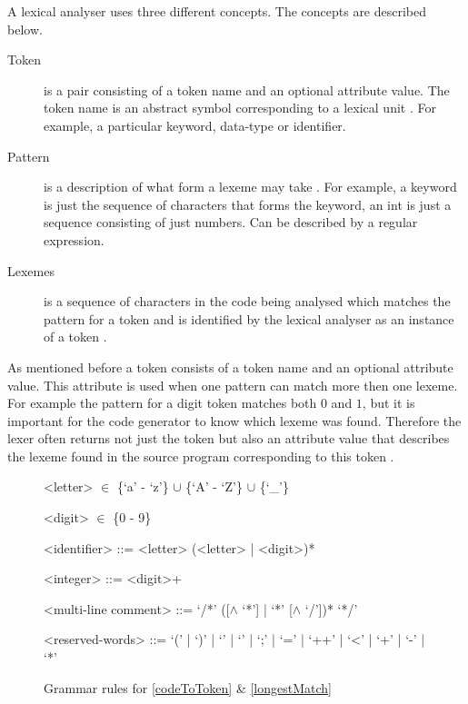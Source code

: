 A lexical analyser uses three different concepts. The concepts are described 
below. 
\begin{description}
  \item[Token]
    is a pair consisting of a token name and an optional attribute value. The 
token name is an abstract symbol corresponding to a lexical unit \cite{Aho2006}. 
For example, a particular keyword, data-type or identifier.
  \item[Pattern]
    is a description of what form a lexeme may take \cite{Aho2006}. 
For example, a keyword is just the sequence of characters that forms the 
keyword, an int is just a sequence consisting of just numbers. Can be described 
by a regular expression.
  \item[Lexemes]
    is a sequence of characters in the code being analysed which 
matches the pattern for a token and is identified by the lexical analyser as an 
instance of a token \cite{Aho2006}.
\end{description}
As mentioned before a token consists of a token name and an optional attribute value. 
This attribute is used when one pattern can match more then one lexeme.
For example the pattern for a digit token matches both $0$ and $1$, 
but it is important for the code generator to know which lexeme was found. 
Therefore the lexer often returns not just the token but also an attribute value 
that describes the lexeme found in the source program corresponding to this 
token \cite{Aho2006}.

\begin{figure}[h!]
\begin{center}
\begin{grammar}

<letter>  $\in$ \{`a' - `z'\} $\cup$ \{`A' - `Z'\} $\cup$ \{`_'\}

<digit>  $\in$ \{0 - 9\}

<identifier> ::= <letter> (<letter> | <digit>)* 

<integer> ::= <digit>+

<multi-line comment> ::= `/*' ([$\wedge$ `*'] | `*' [$\wedge$ `/'])* `*/'

<reserved-words> ::= `(' | `)' | `{' | `}' | `;' | `=' | `++' | `<' | `+' | `-' | `*'

\end{grammar}
\caption{Grammar rules for \cref{codeToToken} \& \cref{longestMatch}\label{fig:grammar}}
\end{center}
\end{figure}

